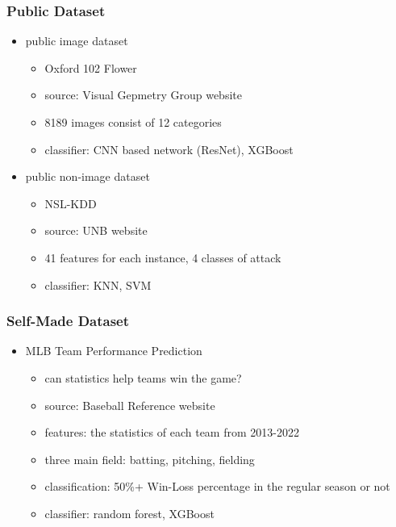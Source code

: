\documentclass[
	11pt, %
	aspectratio=169, %
]{beamer}
\begin{document}
\begin{frame}
	\frametitle{Public Dataset}
	
	\begin{itemize}
		\item public image dataset
		\begin{itemize}
			\item Oxford 102 Flower
			\item source: Visual Gepmetry Group website
			\item 8189 images consist of 12 categories
			\item classifier: CNN based network (ResNet), XGBoost
		\end{itemize}
		\item public non-image dataset
		\begin{itemize}
			\item NSL-KDD
			\item source: UNB website
			\item 41 features for each instance, 4 classes of attack
			\item classifier: KNN, SVM
		\end{itemize}
	\end{itemize}
\end{frame}

\begin{frame}
	\frametitle{Self-Made Dataset}

	\begin{itemize}
		\item MLB Team Performance Prediction
		\begin{itemize}
			\item can statistics help teams win the game?
			\item source: Baseball Reference website
			\item features: the statistics of each team from 2013-2022
			\item three main field: batting, pitching, fielding
			\item classification: 50\%+ Win-Loss percentage in the regular season or not
			\item classifier: random forest, XGBoost
		\end{itemize}
	\end{itemize}
\end{frame}

\end{document}
